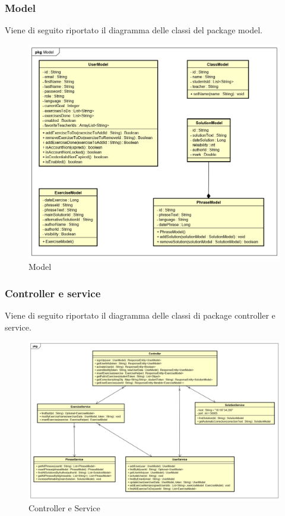 \subsubsection{Model}
Viene di seguito riportato il diagramma delle classi del package model.
\begin{figure}[H]
\centering
\includegraphics[width=17cm, keepaspectratio]{img/model.png} 
\caption{Model}
\end{figure}
\newpage

\subsubsection{Controller e service}
Viene di seguito riportato il diagramma delle classi di package controller e service.
\begin{figure}[H]
\centering
\includegraphics[width=17cm, keepaspectratio]{img/Controller-service.png} 
\caption{Controller e Service}
\end{figure}

